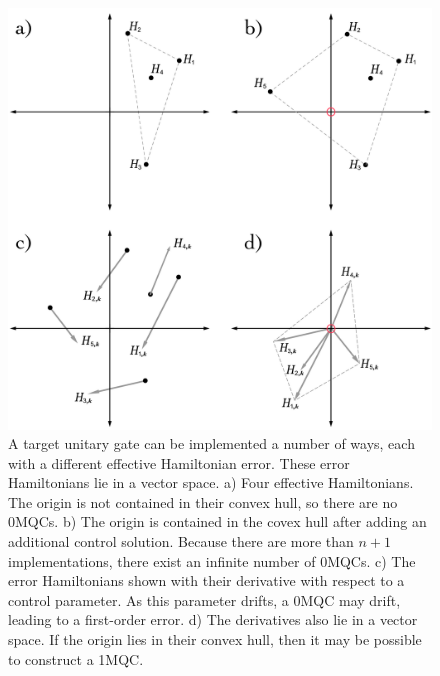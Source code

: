 \documentclass[aps,nofootinbib,pra,notitlepage,twocolumn]{revtex4-1}
\begin{document}
\begin{figure}
  \centering
  \includegraphics[width=\columnwidth]{vectorspace.pdf}
  \caption{A target unitary gate can be implemented a number of ways, each with a different effective Hamiltonian error. These error Hamiltonians lie in a vector space. a) Four effective Hamiltonians. The origin is not contained in their convex hull, so there are no 0MQCs. b) The origin is contained in the covex hull after adding an additional control solution. Because there are more than $n+1$ implementations, there exist an infinite number of 0MQCs. c) The error Hamiltonians shown with their derivative with respect to a control parameter. As this parameter drifts, a 0MQC may drift, leading to a first-order error. d) The derivatives also lie in a vector space. If the origin lies in their convex hull, then it may be possible to construct a 1MQC.}
  \label{fig:vectorspace}
\end{figure}

\end{document}
